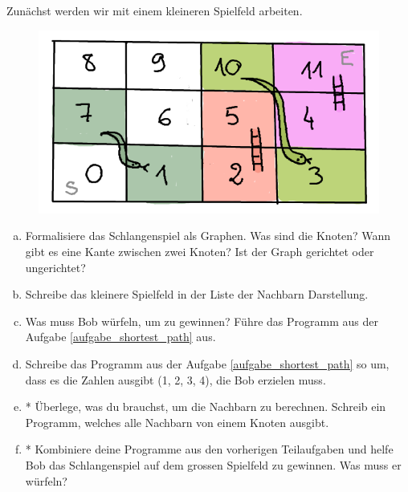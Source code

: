 \begin{aufgabe}\label{aufgabe_schlangenspiel}
Zunächst werden wir mit einem kleineren Spielfeld arbeiten.
\begin{figure}[H]
    \centering
    \includegraphics[width=\textwidth]{Pictures/SP/schlangen_spiel.png}
\end{figure}
\begin{enumerate}[(a)]
    \item Formalisiere das Schlangenspiel als Graphen. Was sind die Knoten? Wann gibt es eine Kante zwischen zwei Knoten? Ist der Graph gerichtet oder ungerichtet?
    \item Schreibe das kleinere Spielfeld in der Liste der Nachbarn Darstellung.
    \item Was muss Bob würfeln, um zu gewinnen? Führe das Programm aus der Aufgabe \ref{aufgabe_shortest_path} aus.
    \item Schreibe das Programm aus der Aufgabe \ref{aufgabe_shortest_path} so um, dass es die Zahlen ausgibt (1, 2, 3, 4), die Bob erzielen muss.
    \item * Überlege, was du brauchst, um die Nachbarn zu berechnen. Schreib ein Programm, welches alle Nachbarn von einem Knoten ausgibt.
    \item * Kombiniere deine Programme aus den vorherigen Teilaufgaben und helfe Bob das Schlangenspiel auf dem grossen Spielfeld zu gewinnen. Was muss er würfeln?
\end{enumerate}{}
\end{aufgabe}
